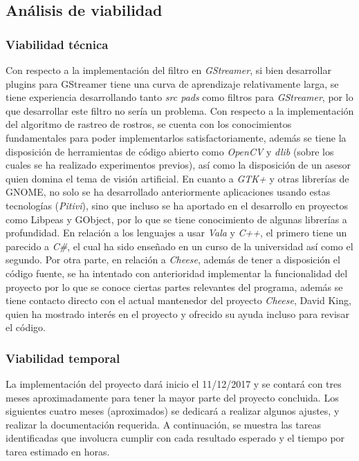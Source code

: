 \documentclass[a4paper,openright,12pt]{report}
\begin{document}
\subsection{Análisis de viabilidad}
\subsubsection{Viabilidad técnica}
Con respecto a la implementación del filtro en \textit{GStreamer}, si bien
desarrollar plugins para GStreamer tiene una curva de aprendizaje relativamente
larga, se tiene experiencia desarrollando tanto \textit{src pads} como filtros
para \textit{GStreamer}, por lo que desarrollar este filtro no sería un
problema. Con respecto a la implementación del algoritmo de rastreo de rostros,
se cuenta con los conocimientos fundamentales para poder implementarlos
satisfactoriamente, además se tiene la disposición de herramientas de código
abierto como \textit{OpenCV} y \textit{dlib} (sobre los cuales se ha realizado
experimentos previos), así como la disposición de un asesor quien domina el tema
de visión artificial. En cuanto a \textit{GTK+} y otras librerías de
GNOME, no solo se ha desarrollado anteriormente aplicaciones usando estas
tecnologías (\textit{Pitivi}), sino que incluso se ha aportado en el desarrollo
en proyectos como Libpeas y GObject, por lo que se tiene
conocimiento de algunas librerías a profundidad. En relación a los lenguajes a
usar \textit{Vala} y \textit{C++}, el primero tiene un parecido a \textit{C\#},
el cual ha sido enseñado en un curso de la universidad así como el segundo. Por
otra parte, en relación a \textit{Cheese}, además de tener a disposición el
código fuente, se ha intentado con anterioridad implementar la funcionalidad del
proyecto por lo que se conoce ciertas partes relevantes del programa, además se
tiene contacto directo con el actual mantenedor del proyecto \textit{Cheese},
David King, quien ha mostrado interés en el proyecto y ofrecido su ayuda incluso
para revisar el código.

\subsubsection{Viabilidad temporal}
La implementación del proyecto dará inicio el 11/12/2017 y se contará con tres
meses aproximadamente para tener la mayor parte del proyecto concluida. Los
siguientes cuatro meses (aproximados) se dedicará a realizar algunos ajustes, y
realizar la documentación requerida. A continuación, se muestra las tareas
identificadas que involucra cumplir con cada resultado esperado y el tiempo por
tarea estimado en horas.
\end{document}
